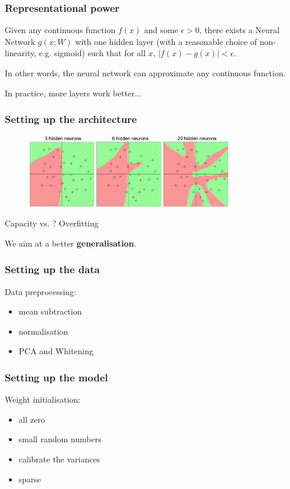 \begin{frame}
	\frametitle{Representational power}

	Given any continuous function $f(x)$ and some $\epsilon > 0$, there exists a Neural Network $g(x;W)$ 
	with one hidden layer (with a reasonable choice of non-linearity, e.g. sigmoid) such that for 
	all $x$, $\mid f(x)-g(x) \mid <\epsilon$. 

	\vskip 0.5cm

	In other words, the neural network can approximate any continuous function.

	\vskip 0.5cm

	In practice, more layers work better...

\end{frame}

\begin{frame}
	\frametitle{Setting up the architecture}

	\begin{figure}
        	\includegraphics[width=0.8\textwidth]{Pics/layer_sizes}
      	\end{figure}

	Capacity vs. ? \pause Overfitting

	We aim at a better \textbf{generalisation}.

\end{frame}


\begin{frame}
	\frametitle{Setting up the data}

	Data preprocessing:
	\begin{itemize}
		\item mean subtraction
		\item normalisation
		\item PCA and Whitening
	\end{itemize}

\end{frame}


\begin{frame}
        \frametitle{Setting up the model}

        Weight initialisation:
        \begin{itemize}
                \item all zero
                \item small random numbers
                \item calibrate the variances
		\item sparse
        \end{itemize}

\end{frame}

